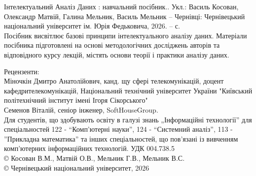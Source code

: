 \documentclass[10pt, openany]{book}
\begin{document}
\begin{large}
Інтелектуальний Аналіз Даних : навчальний посібник.. Укл.: Василь Косован, Олександр Матвій, Галина Мельник, Василь Мельник – 
Чернівці: Чернівецький національний університет ім. Юрія Федьковича, 2026. –  с.  \\

Посібник висвітлює базові принципи інтелектуального аналізу даних. Матеріали посібника підготовлені на 
основі методологічних досліджень авторів та відповідного курсу лекцій, містять основи теорії і практики аналізу даних.

Рецензенти: \\
Міночкін Дмитро Анатолійович, канд. щу сфері телекомунікацій, доцент кафедрителекомунікацій, 
Національний технічний університет України "Київський політехнічний інститут імені Ігоря Сікорського"\\
Семенов Віталій, сеніор інженер, SoftHouseGroup. \\

 
Для студентів, що здобувають освіту в галузі знань „Інформаційні технології” для спеціальностей 122 - 
“Комп’ютерні науки”, 124 - “Системний аналіз”, 113 - ”Прикладна математика” та інших спеціальностей, 
що пов'язані із вивченням комп'ютерних інформаційних технологій. УДК 004.738.5 \\


© Косован В.М., Матвій О.В., Мельник Г.В., Мельник В.С. \\

© Чернівецький національний університет, 2026 \\



    \vfill


\pagebreak
\tableofcontents

% 


































\end{large}
\end{document}
